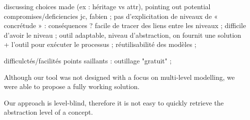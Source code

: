 discussing choices  made (ex : héritage vs attr), pointing out potential compromises/deficiencies
jc, fabien ; 
pas d'explicitation de niveaux de « concrétude » : conséquences ? facile de tracer des liens entre les niveaux ; difficile d'avoir le niveau ; 
outil adaptable, niveau d'abstraction, on fournit une solution + l'outil pour exécuter le processus ; réutilisabilité des modèles ; 

difficulctés/facilités
points saillants :  outillage "gratuit" ; 



Although our tool was not designed with a focus on multi-level modelling, we were able to propose a fully working solution. 

Our approach is level-blind, therefore it is not easy to quickly retrieve the abstraction level of a concept.
